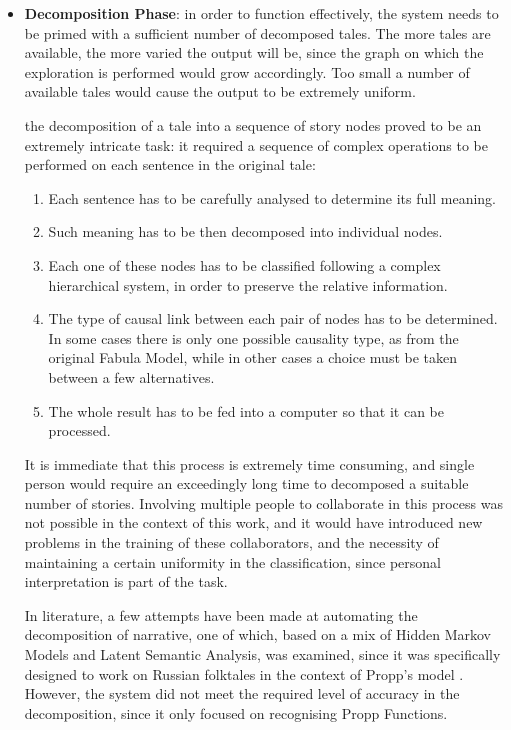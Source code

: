 \documentclass[12pt,a4paper,oneside]{report}
\begin{document}
\begin{itemize}\setlength{\itemsep}{0pt}
\item \textbf{Decomposition Phase}: in order to function effectively, the system needs to be primed with a sufficient number of decomposed tales. The more tales are available, the more varied the output will be, since the graph on which the exploration is performed would grow accordingly. Too small a number of available tales would cause the output to be extremely uniform.

\bigskip

the decomposition of a tale into a sequence of story nodes proved to be an extremely intricate task: it required a sequence of complex operations to be performed on each sentence in the original tale:

\begin{enumerate}\setlength{\itemsep}{0pt}
\item Each sentence has to be carefully analysed to determine its full meaning. 
\item Such meaning has to be then decomposed into individual nodes. 
\item Each one of these nodes has to be classified following a complex hierarchical system, in order to preserve the relative information. 
\item The type of causal link between each pair of nodes has to be determined. In some cases there is only one possible causality type, as from the original Fabula Model, while in other cases a choice must be taken between a few alternatives.
\item The whole result has to be fed into a computer so that it can be processed.
\end{enumerate}

It is immediate that this process is extremely time consuming, and single person would require an exceedingly long time to decomposed a suitable number of stories. Involving multiple people to collaborate in this process was not possible in the context of this work, and it would have introduced new problems in the training of these collaborators, and the necessity of maintaining a certain uniformity in the classification, since personal interpretation is part of the task.

In literature, a few attempts have been made at automating the decomposition of narrative, one of which, based on a mix of Hidden Markov Models and Latent Semantic Analysis, was examined, since it was specifically designed to work on Russian folktales in the context of Propp's model \cite{autopropp}. However, the system did not meet the required level of accuracy in the decomposition, since it only focused on recognising Propp Functions.


\end{itemize}
\end{document}
